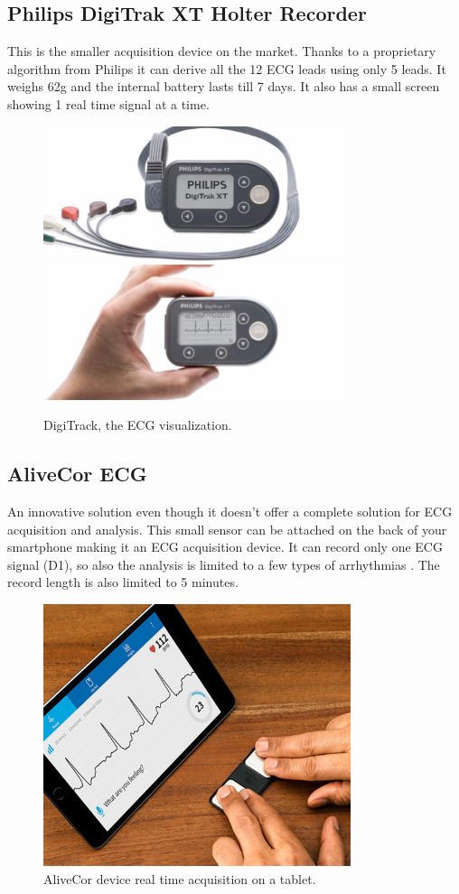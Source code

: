 \subsection{Philips DigiTrak XT Holter Recorder}
This is the smaller acquisition device on the market. Thanks to a proprietary algorithm from Philips it can derive all the 12 ECG leads using only 5 leads. It weighs 62g and the internal battery lasts till 7 days. It also has a small screen showing 1 real time signal at a time.
\begin{figure}[ht!]
	\centering
	\includegraphics[width=90mm]{figures/ch3/2a.png}
	\includegraphics[width=90mm]{figures/ch3/2b.png}
	\caption{DigiTrack, the ECG visualization.}
	\label{fig3.2}
\end{figure}

\subsection{AliveCor ECG}
An innovative solution even though it doesn’t offer a complete solution for ECG acquisition and analysis. This small sensor can be attached on the back of your smartphone making it an ECG acquisition device. It can record only one ECG signal (D1), so also the analysis is limited to a few types of arrhythmias . The record length is also limited to 5 minutes.
\begin{figure}[ht!]
	\centering
	\includegraphics[width=90mm]{figures/ch3/3.png}
	\caption{AliveCor device real time acquisition on a tablet.}
	\label{fig3.3}
\end{figure}

